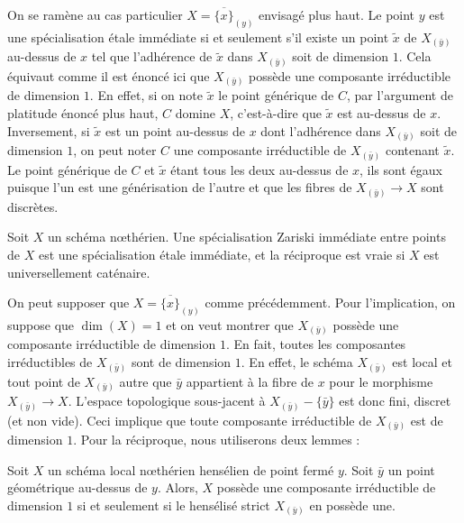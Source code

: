 \documentclass[10pt]{../fichiers-configuration-latex/smfart}
\begin{document}
\begin{démo} On se ramène au cas particulier $X=\overline{\{x\}}_{(y)}$ envisagé plus haut. Le point
$y$ est une spécialisation étale immédiate si et seulement s'il existe un point $\tilde{x}$ de
$X_{(\bar{y})}$ au-dessus de $x$ tel que l'adhérence de $\tilde{x}$ dans $X_{(\bar{y})}$ soit de
dimension $1$. Cela équivaut comme il est énoncé ici que $X_{(\bar{y})}$ possède une composante
irréductible de dimension $1$. En effet, si on note $\tilde{x}$ le point générique de $C$, par
l'argument de platitude énoncé plus haut, $C$ domine $X$, c'est-à-dire que $\tilde{x}$ est au-dessus
de $x$. Inversement, si $\tilde{x}$ est un point au-dessus de $x$ dont l'adhérence dans $X_{(\bar
y)}$ soit de dimension $1$, on peut noter $C$ une composante irréductible de $X_{(\bar y)}$
contenant $\tilde{x}$. Le point générique de $C$ et $\tilde{x}$ étant tous les deux au-dessus de
$x$, ils sont égaux puisque l'un est une générisation de l'autre et que les fibres de $X_{(\bar
y)}\to X$ sont discrètes.  \end{démo}

\medskip

\begin{proposition2} \label{14-prop-specialisation-zar-et} Soit $X$ un schéma nœthérien. Une
spécialisation Zariski immédiate entre points de $X$ est une spécialisation étale immédiate, et la
réciproque est vraie si $X$ est universellement caténaire.  \end{proposition2}

On peut supposer que $X=\overline{\{x\}}_{(y)}$ comme précédemment. Pour l'implication, on suppose
que $\dim(X)=1$ et on veut montrer que $X_{(\bar y)}$ possède une composante irréductible de
dimension $1$. En fait, toutes les composantes irréductibles de $X_{(\bar y)}$ sont de dimension
$1$. En effet, le schéma $X_{(\bar y)}$ est local et tout point de $X_{(\bar y)}$ autre que $\bar y$
appartient à la fibre de $x$ pour le morphisme  $X_{(\bar y)}\to X$. L'espace
topologique sous-jacent à $X_{(\bar y)}-\{\bar y\}$ est donc fini, discret (et non vide). Ceci
implique que toute composante irréductible de $X_{(\bar y)}$ est de dimension $1$. Pour la
réciproque, nous utiliserons deux lemmes :

\begin{lemme2}\label{14-lemme-riou-1} Soit $X$ un schéma local nœthérien hensélien de point fermé
$y$. Soit $\bar y$ un point géométrique au-dessus de $y$. Alors, $X$ possède une composante
irréductible de dimension $1$ si et seulement si le hensélisé strict $X_{(\bar y)}$ en possède une.
\end{lemme2}
\end{document}
